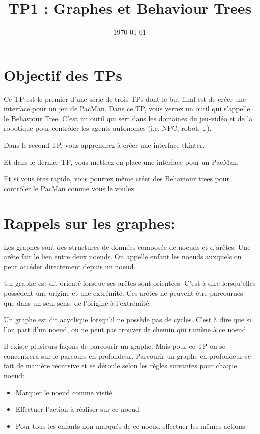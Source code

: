 \documentclass{article}
\date{\today}
\title{TP1 : Graphes et Behaviour Trees}
\begin{document}
\maketitle

\section{Objectif des TPs}
\label{sec-1}
Ce TP est le premier d'une série de trois TPs dont le but final est de créer une interface pour un jeu de PacMan.
Dans ce TP, vous verrez un outil qui s'appelle le Behaviour Tree.
C'est un outil qui sert dans les domaines du jeu-vidéo et de la robotique pour contrôler les agents autonomes (i.e. NPC, robot, \ldots{}).

\noindent
Dans le second TP, vous apprendrez à créer une interface tkinter.

\noindent
Et dans le dernier TP, vous mettrez en place une interface pour un PacMan.

\noindent
Et si vous êtes rapide, vous pourrez même créer des Behaviour trees pour contrôler le PacMan comme vous le voulez.

\section{Rappels sur les graphes:}
\label{sec-2}
Les graphes sont des structures de données composée de noeuds et d'arêtes.
Une arête fait le lien entre deux noeuds.
On appelle enfant les noeuds auxquels on peut accéder directement depuis un noeud.

Un graphe est dit orienté lorsque ses arêtes sont orientées.
C'est à dire lorsqu'elles possèdent une origine et une extrémité.
Ces arêtes ne peuvent être parcourues que dans un seul sens, de l'origine à l'extrémité.

Un graphe est dit acyclique lorsqu'il ne possède pas de cycles.
C'est à dire que si l'on part d'un noeud, on ne peut pas trouver de chemin qui ramène à ce noeud.

Il existe plusieurs façons de parcourir un graphe. Mais pour ce TP on se concentrera sur le parcours en profondeur.
Parcourir un graphe en profondeur se fait de manière récursive et se déroule selon les règles suivantes pour chaque noeud: 
\begin{itemize}
\item Marquer le noeud comme visité
\item Effectuer l'action à réaliser sur ce noeud
\item Pour tous les enfants non marqués de ce noeud effectuer les mêmes actions
\end{itemize}
\end{document}
